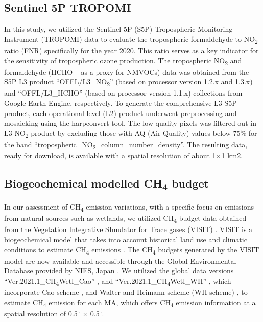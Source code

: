 \subsection{Sentinel 5P TROPOMI}
In this study, we utilized the Sentinel 5P (S5P) Tropospheric Monitoring Instrument (TROPOMI) data to evaluate the tropospheric formaldehyde-to-NO\textsubscript{2} ratio (FNR) specifically for the year 2020. This ratio serves as a key indicator for the sensitivity of tropospheric ozone production. The tropospheric NO\textsubscript{2} and formaldehyde (HCHO – as a proxy for NMVOCs) data was obtained from the S5P L3 product \enquote{OFFL\slash L3\_NO\textsubscript{2}} (based on processor version 1.2.x and 1.3.x) and \enquote{OFFL\slash L3\_HCHO} (based on processor version 1.1.x) collections from Google Earth Engine, respectively. To generate the comprehensive L3 S5P product, each operational level (L2) product underwent preprocessing and mosaicking using the harpconvert tool. The low-quality pixels was filtered out in L3 NO\textsubscript{2} product by excluding those with AQ (Air Quality) values below 75\% for the band \enquote{tropospheric\_NO\textsubscript{2}\_column\_number\_density}. The resulting data, ready for download, is available with a spatial resolution of about 1$\times$1 km2.
\subsection{Biogeochemical modelled CH\textsubscript{4} budget}
In our assessment of CH\textsubscript{4} emission variations, with a specific focus on emissions from natural sources such as wetlands, we utilized CH\textsubscript{4} budget data obtained from the Vegetation Integrative SImulator for Trace gases (VISIT) \citep{ito2019methane}. VISIT is a biogeochemical model that takes into account historical land use and climatic conditions to estimate CH\textsubscript{4} emissions \citep{ito2019methane}. The CH\textsubscript{4} budgets generated by the VISIT model are now available and accessible through the Global Environmental Database provided by NIES, Japan \citep{ito2019methane}. We utilized the global data versions \enquote{Ver.2021.1\_CH\textsubscript{4}Wetl\_Cao} \citep{ito2021cao}, and \enquote{Ver.2021.1\_CH\textsubscript{4}Wetl\_WH} \citep{ito2021wh}, which incorporate Cao scheme \citep{cao1996global}, and Walter and Heimann scheme (WH scheme) \citep{walter2000process}, to estimate CH\textsubscript{4} emission for each MA, which offers CH\textsubscript{4} emission information at a spatial resolution of 0.5$^{\circ}$ $\times$ 0.5$^{\circ}$. \par
